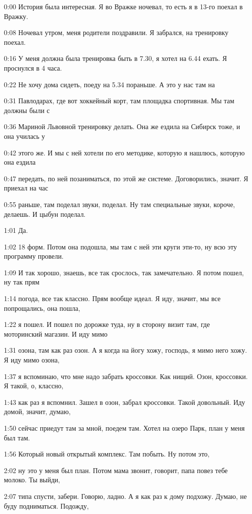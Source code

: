 0:00
История была интересная. Я во Вражке ночевал, то есть я в 13-го поехал в Вражку.

0:08
Ночевал утром, меня родители поздравили. Я забрался, на тренировку поехал.

0:16
У меня должна была тренировка быть в 7.30, я хотел на 6.44 ехать. Я проснулся в 4 часа.

0:22
Не хочу дома сидеть, поеду на 5.34 пораньше. А это у нас там на

0:31
Павлодарах, где вот хоккейный корт, там площадка спортивная. Мы там должны были с

0:36
Мариной Львовной тренировку делать. Она же ездила на Сибирск тоже, и она училась у

0:42
этого же. И мы с ней хотели по его методике, которую я нашлюсь, которую она ездила

0:47
передать, по ней позаниматься, по этой же системе. Договорились, значит. Я приехал на час

0:55
раньше, там поделал звуки, поделал. Ну там специальные звуки, короче, делаешь. И цыбун поделал.

1:01
Да.

1:02
18 форм. Потом она подошла, мы там с ней эти круги эти-то, ну всю эту программу провели.

1:09
И так хорошо, знаешь, все так срослось, так замечательно. Я потом пошел, ну так прям

1:14
погода, все так классно. Прям вообще идеал. Я иду, значит, мы все попрощались, она пошла,

1:22
я пошел. И пошел по дорожке туда, ну в сторону визит там, где моторинский магазин. И иду мимо

1:31
озона, там как раз озон. А я когда на йогу хожу, господь, я мимо него хожу. Я иду мимо озона,

1:37
я вспоминаю, что мне надо забрать кроссовки. Как нищий. Озон, кроссовки. Я такой, о, классно,

1:43
как раз я вспомнил. Зашел в озон, забрал кроссовки. Такой довольный. Иду домой, значит, думаю,

1:50
сейчас приедут там за мной, поедем там. Хотел на озеро Парк, план у меня был там.

1:56
Который новый открытый комплекс. Там побыть. Ну потом это,

2:02
ну это у меня был план. Потом мама звонит, говорит, папа повез тебе молоко. Ты выйди,

2:07
типа спусти, забери. Говорю, ладно. А я как раз к дому подхожу. Думаю, не буду подниматься. Подожду,

